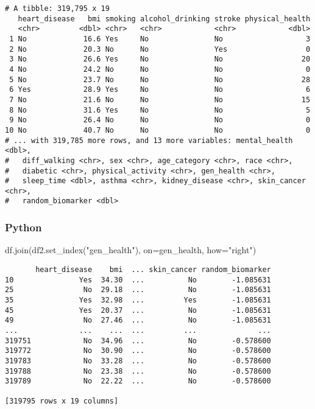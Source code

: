 \documentclass[
  letterpaper,
  DIV=11,
  numbers=noendperiod]{scrreprt}
\newenvironment{Shaded}{\begin{snugshade}}{\end{snugshade}}
\newcommand{\NormalTok}[1]{\textcolor[rgb]{0.00,0.46,0.62}{#1}}
\newcommand{\OperatorTok}[1]{\textcolor[rgb]{0.37,0.37,0.37}{#1}}
\newcommand{\StringTok}[1]{\textcolor[rgb]{0.13,0.47,0.30}{#1}}
\begin{document}
\begin{verbatim}
# A tibble: 319,795 x 19
   heart_disease   bmi smoking alcohol_drinking stroke physical_health
   <chr>         <dbl> <chr>   <chr>            <chr>            <dbl>
 1 No             16.6 Yes     No               No                   3
 2 No             20.3 No      No               Yes                  0
 3 No             26.6 Yes     No               No                  20
 4 No             24.2 No      No               No                   0
 5 No             23.7 No      No               No                  28
 6 Yes            28.9 Yes     No               No                   6
 7 No             21.6 No      No               No                  15
 8 No             31.6 Yes     No               No                   5
 9 No             26.4 No      No               No                   0
10 No             40.7 No      No               No                   0
# ... with 319,785 more rows, and 13 more variables: mental_health <dbl>,
#   diff_walking <chr>, sex <chr>, age_category <chr>, race <chr>,
#   diabetic <chr>, physical_activity <chr>, gen_health <chr>,
#   sleep_time <dbl>, asthma <chr>, kidney_disease <chr>, skin_cancer <chr>,
#   random_biomarker <dbl>
\end{verbatim}

\hypertarget{python-35}{%
\subsubsection{Python}\label{python-35}}

\begin{Shaded}
\begin{Highlighting}[]
\NormalTok{df.join(df2.set\_index(}\StringTok{"gen\_health"}\NormalTok{), on}\OperatorTok{=}\StringTok{\textquotesingle{}gen\_health\textquotesingle{}}\NormalTok{, how}\OperatorTok{=}\StringTok{"right"}\NormalTok{)}
\end{Highlighting}
\end{Shaded}

\begin{verbatim}
       heart_disease    bmi  ... skin_cancer random_biomarker
10               Yes  34.30  ...          No        -1.085631
25                No  29.18  ...          No        -1.085631
35               Yes  32.98  ...         Yes        -1.085631
45               Yes  20.37  ...          No        -1.085631
49                No  27.46  ...          No        -1.085631
...              ...    ...  ...         ...              ...
319751            No  34.96  ...          No        -0.578600
319772            No  30.90  ...          No        -0.578600
319783            No  33.28  ...          No        -0.578600
319788            No  23.38  ...          No        -0.578600
319789            No  22.22  ...          No        -0.578600

[319795 rows x 19 columns]
\end{verbatim}
\end{document}
